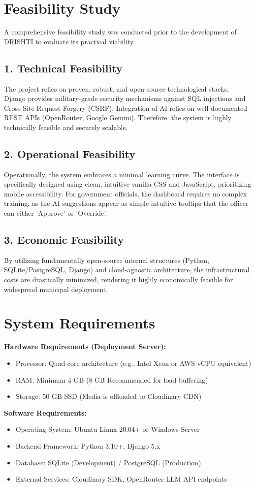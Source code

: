 \documentclass[12pt,a4paper]{report}
\begin{document}
\section{Feasibility Study}
A comprehensive feasibility study was conducted prior to the development of DRISHTI to evaluate its practical viability.

\subsection*{1. Technical Feasibility}
The project relies on proven, robust, and open-source technological stacks. Django provides military-grade security mechanisms against SQL injections and Cross-Site Request Forgery (CSRF). Integration of AI relies on well-documented REST APIs (OpenRouter, Google Gemini). Therefore, the system is highly technically feasible and securely scalable.

\subsection*{2. Operational Feasibility}
Operationally, the system embraces a minimal learning curve. The interface is specifically designed using clean, intuitive vanilla CSS and JavaScript, prioritizing mobile accessibility. For government officials, the dashboard requires no complex training, as the AI suggestions appear as simple intuitive tooltips that the officer can either 'Approve' or 'Override'.

\subsection*{3. Economic Feasibility}
By utilizing fundamentally open-source internal structures (Python, SQLite/PostgreSQL, Django) and cloud-agnostic architecture, the infrastructural costs are drastically minimized, rendering it highly economically feasible for widespread municipal deployment. 

\section{System Requirements}
\textbf{Hardware Requirements (Deployment Server):}
\begin{itemize}
    \item Processor: Quad-core architecture (e.g., Intel Xeon or AWS vCPU equivalent)
    \item RAM: Minimum 4 GB (8 GB Recommended for load buffering)
    \item Storage: 50 GB SSD (Media is offloaded to Cloudinary CDN)
\end{itemize}
\textbf{Software Requirements:}
\begin{itemize}
    \item Operating System: Ubuntu Linux 20.04+ or Windows Server
    \item Backend Framework: Python 3.10+, Django 5.x
    \item Database: SQLite (Development) / PostgreSQL (Production)
    \item External Services: Cloudinary SDK, OpenRouter LLM API endpoints
\end{itemize}
\end{document}
